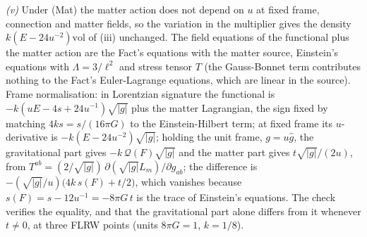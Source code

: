 \emph{(v)} Under (Mat) the matter action does not depend on $u$ at fixed frame, connection and matter fields, so the variation in the multiplier gives the density $k(E - 24u^{-2})\mathrm{vol}$ of (iii) unchanged. The field equations of the functional plus the matter action are the Fact's equations with the matter source, Einstein's equations with $\Lambda = 3/\ell^{2}$ and stress tensor $T$ (the Gauss-Bonnet term contributes nothing to the Fact's Euler-Lagrange equations, which are linear in the source). Frame normalisation: in Lorentzian signature the functional is $-k(uE - 4s + 24u^{-1})\sqrt{|g|}$ plus the matter Lagrangian, the sign fixed by matching $4ks = s/(16\pi G)$ to the Einstein-Hilbert term; at fixed frame its $u$-derivative is $-k(E - 24u^{-2})\sqrt{|g|}$; holding the unit frame, $g = u\hat g$, the gravitational part gives $-k\,\mathcal{Q}(F)\sqrt{|g|}$ and the matter part gives $t\sqrt{|g|}/(2u)$, from $T^{ab} = (2/\sqrt{|g|})\,\partial(\sqrt{|g|}L_{m})/\partial g_{ab}$; the difference is $-(\sqrt{|g|}/u)\bigl(4k\,s(F) + t/2\bigr)$, which vanishes because $s(F) = s - 12u^{-1} = -8\pi G\,t$ is the trace of Einstein's equations. The check verifies the equality, and that the gravitational part alone differs from it whenever $t \neq 0$, at three FLRW points (units $8\pi G = 1$, $k = 1/8$).

